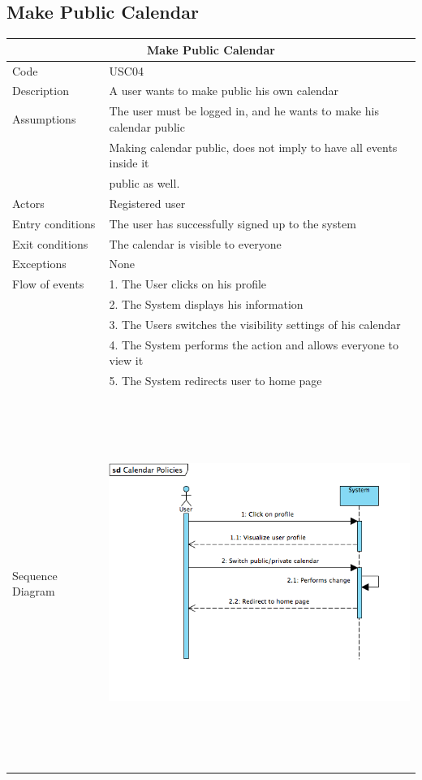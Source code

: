 \documentclass[12pt]{book}
\begin{document}
\subsection{Make Public Calendar}
\vspace*{\fill}
\begin{center}
\begin{tabular}{ |l|l| }
  		\hline
  		\hline
  		\multicolumn{2}{|c|}{\large{\textbf{Make Public Calendar}}} \\
  		\hline
  		\hline
  		Code  & USC04\\ 
		\hline
		Description & A user wants to make public his own calendar\\
		\hline
		Assumptions & The user must be logged in, and he wants to make his calendar public\\&
		Making calendar public, does not imply to have all events inside it\\ & public as well. \\
		\hline
		Actors & Registered user\\
		\hline
		Entry conditions & The user has successfully signed up to the system\\
		\hline
		Exit conditions & The calendar is visible to everyone\\
		\hline
		Exceptions & None \\
		\hline
		Flow of events & 
			1. The User clicks on his profile\\&
			2. The System displays his information\\&
			3. The Users switches the visibility settings of his calendar\\&
			4. The System performs the action and allows everyone to view it\\ &
			5. The System redirects user to home page \\
			
  		\hline 
		 &\\
		Sequence Diagram &  \includegraphics[width=12cm, height=12cm]{CalendarPoliciesSD}\\
		\hline
  		\hline
\end{tabular} \\
\end{center}
\end{document}
